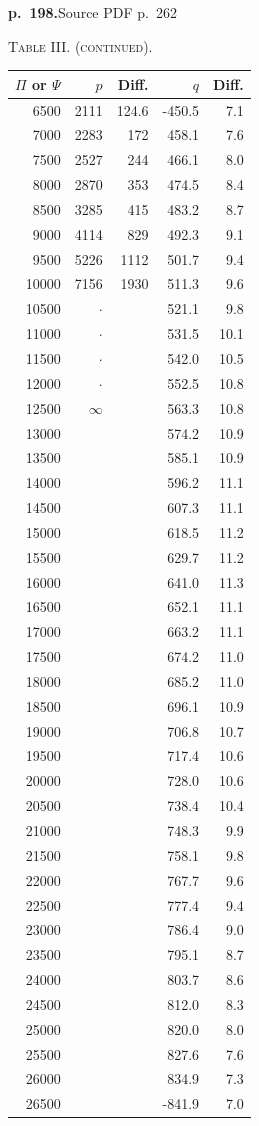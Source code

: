 \documentclass[11pt,a4paper]{article}
\newcommand{\sourcepage}[2]{\par\bigskip\noindent\textbf{p.~#1.}\hfill{\footnotesize Source PDF p.~#2}\par\nobreak\medskip}
\begin{document}
\sourcepage{198}{262}
\begin{center}
\textsc{Table III. (continued).}\par
\begin{tabular}{rrrrr}
\toprule
$\Pi$ or $\Psi$&$p$&Diff.&$q$&Diff.\\
\midrule
6500&2111&124.6&-450.5&7.1\\
7000&2283&172&458.1&7.6\\
7500&2527&244&466.1&8.0\\
8000&2870&353&474.5&8.4\\
8500&3285&415&483.2&8.7\\
9000&4114&829&492.3&9.1\\
9500&5226&1112&501.7&9.4\\
10000&7156&1930&511.3&9.6\\
10500&$\cdot$&&521.1&9.8\\
11000&$\cdot$&&531.5&10.1\\
11500&$\cdot$&&542.0&10.5\\
12000&$\cdot$&&552.5&10.8\\
12500&$\infty$&&563.3&10.8\\
13000&&&574.2&10.9\\
13500&&&585.1&10.9\\
14000&&&596.2&11.1\\
14500&&&607.3&11.1\\
15000&&&618.5&11.2\\
15500&&&629.7&11.2\\
16000&&&641.0&11.3\\
16500&&&652.1&11.1\\
17000&&&663.2&11.1\\
17500&&&674.2&11.0\\
18000&&&685.2&11.0\\
18500&&&696.1&10.9\\
19000&&&706.8&10.7\\
19500&&&717.4&10.6\\
20000&&&728.0&10.6\\
20500&&&738.4&10.4\\
21000&&&748.3&9.9\\
21500&&&758.1&9.8\\
22000&&&767.7&9.6\\
22500&&&777.4&9.4\\
23000&&&786.4&9.0\\
23500&&&795.1&8.7\\
24000&&&803.7&8.6\\
24500&&&812.0&8.3\\
25000&&&820.0&8.0\\
25500&&&827.6&7.6\\
26000&&&834.9&7.3\\
26500&&&-841.9&7.0\\
\bottomrule
\end{tabular}
\end{center}
\end{document}
